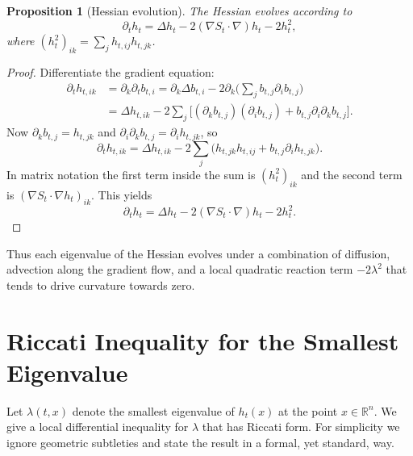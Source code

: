 \documentclass[11pt]{article}
\newtheorem{proposition}[theorem]{Proposition}
\begin{document}
\begin{proposition}[Hessian evolution]
The Hessian evolves according to
\begin{equation}
  \partial_t h_t
  = \Delta h_t - 2(\nabla S_t\cdot\nabla)h_t - 2h_t^2,
\end{equation}
where $(h_t^2)_{ik} = \sum_j h_{t,ij}h_{t,jk}$.
\end{proposition}

\begin{proof}
Differentiate the gradient equation:
\begin{align}
  \partial_t h_{t,ik}
  &= \partial_k\partial_t b_{t,i}
   = \partial_k\Delta b_{t,i}
     - 2\partial_k\Big(\sum_j b_{t,j}\partial_i b_{t,j}\Big) \nonumber\\
  &= \Delta h_{t,ik}
     - 2\sum_j\big[(\partial_k b_{t,j})(\partial_i b_{t,j})
                    + b_{t,j}\partial_i\partial_k b_{t,j}\big].
\end{align}
Now $\partial_k b_{t,j} = h_{t,jk}$ and
$\partial_i\partial_k b_{t,j} = \partial_i h_{t,jk}$, so
\begin{equation}
  \partial_t h_{t,ik}
  = \Delta h_{t,ik}
     - 2\sum_j\big(h_{t,jk}h_{t,ij} + b_{t,j}\partial_i h_{t,jk}\big).
\end{equation}
In matrix notation the first term inside the sum is $(h_t^2)_{ik}$ and
the second term is $(\nabla S_t\cdot\nabla h_t)_{ik}$. This yields
\begin{equation}
  \partial_t h_t
  = \Delta h_t - 2(\nabla S_t\cdot\nabla)h_t - 2h_t^2.
\end{equation}
\end{proof}

Thus each eigenvalue of the Hessian evolves under a combination of
diffusion, advection along the gradient flow, and a local quadratic
reaction term $-2\lambda^2$ that tends to drive curvature towards zero.

\section{Riccati Inequality for the Smallest Eigenvalue}

Let $\lambda(t,x)$ denote the smallest eigenvalue of $h_t(x)$ at the
point $x\in\mathbb{R}^n$. We give a local differential inequality for
$\lambda$ that has Riccati form. For simplicity we ignore geometric
subtleties and state the result in a formal, yet standard, way.
\end{document}
